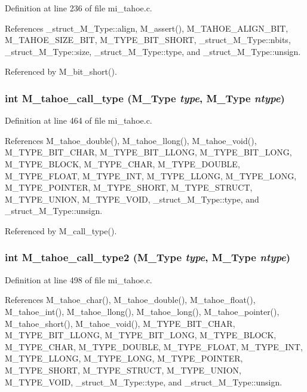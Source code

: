 Definition at line 236 of file mi\_\-tahoe.c.

References \_\-struct\_\-M\_\-Type::align, M\_\-assert(), M\_\-TAHOE\_\-ALIGN\_\-BIT, M\_\-TAHOE\_\-SIZE\_\-BIT, M\_\-TYPE\_\-BIT\_\-SHORT, \_\-struct\_\-M\_\-Type::nbits, \_\-struct\_\-M\_\-Type::size, \_\-struct\_\-M\_\-Type::type, and \_\-struct\_\-M\_\-Type::unsign.

Referenced by M\_\-bit\_\-short().
\subsubsection{\setlength{\rightskip}{0pt plus 5cm}int M\_\-tahoe\_\-call\_\-type (\bf{M\_\-Type} {\em type}, \bf{M\_\-Type} {\em ntype})}\label{m__tahoe_8h_562c80bd43de27fd0c1765eb10972403}




Definition at line 464 of file mi\_\-tahoe.c.

References M\_\-tahoe\_\-double(), M\_\-tahoe\_\-llong(), M\_\-tahoe\_\-void(), M\_\-TYPE\_\-BIT\_\-CHAR, M\_\-TYPE\_\-BIT\_\-LLONG, M\_\-TYPE\_\-BIT\_\-LONG, M\_\-TYPE\_\-BLOCK, M\_\-TYPE\_\-CHAR, M\_\-TYPE\_\-DOUBLE, M\_\-TYPE\_\-FLOAT, M\_\-TYPE\_\-INT, M\_\-TYPE\_\-LLONG, M\_\-TYPE\_\-LONG, M\_\-TYPE\_\-POINTER, M\_\-TYPE\_\-SHORT, M\_\-TYPE\_\-STRUCT, M\_\-TYPE\_\-UNION, M\_\-TYPE\_\-VOID, \_\-struct\_\-M\_\-Type::type, and \_\-struct\_\-M\_\-Type::unsign.

Referenced by M\_\-call\_\-type().
\subsubsection{\setlength{\rightskip}{0pt plus 5cm}int M\_\-tahoe\_\-call\_\-type2 (\bf{M\_\-Type} {\em type}, \bf{M\_\-Type} {\em ntype})}\label{m__tahoe_8h_6ec662cacd0816f49a4e3895db514ae3}




Definition at line 498 of file mi\_\-tahoe.c.

References M\_\-tahoe\_\-char(), M\_\-tahoe\_\-double(), M\_\-tahoe\_\-float(), M\_\-tahoe\_\-int(), M\_\-tahoe\_\-llong(), M\_\-tahoe\_\-long(), M\_\-tahoe\_\-pointer(), M\_\-tahoe\_\-short(), M\_\-tahoe\_\-void(), M\_\-TYPE\_\-BIT\_\-CHAR, M\_\-TYPE\_\-BIT\_\-LLONG, M\_\-TYPE\_\-BIT\_\-LONG, M\_\-TYPE\_\-BLOCK, M\_\-TYPE\_\-CHAR, M\_\-TYPE\_\-DOUBLE, M\_\-TYPE\_\-FLOAT, M\_\-TYPE\_\-INT, M\_\-TYPE\_\-LLONG, M\_\-TYPE\_\-LONG, M\_\-TYPE\_\-POINTER, M\_\-TYPE\_\-SHORT, M\_\-TYPE\_\-STRUCT, M\_\-TYPE\_\-UNION, M\_\-TYPE\_\-VOID, \_\-struct\_\-M\_\-Type::type, and \_\-struct\_\-M\_\-Type::unsign.

